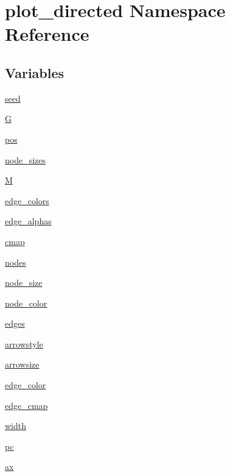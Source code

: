 \hypertarget{namespaceplot__directed}{}\section{plot\+\_\+directed Namespace Reference}
\label{namespaceplot__directed}
\subsection*{Variables}
\begin{DoxyCompactItemize}
\item 
\hyperlink{namespaceplot__directed_a766e952c8362606304e4f31c082e4c9c}{seed}
\item 
\hyperlink{namespaceplot__directed_a092250c49ed5b4f2f22ad54a9c0139f0}{G}
\item 
\hyperlink{namespaceplot__directed_a78aea26e34763b0cafe73f527626f445}{pos}
\item 
\hyperlink{namespaceplot__directed_a47903c90ca8f43b582e606c0285d077d}{node\+\_\+sizes}
\item 
\hyperlink{namespaceplot__directed_aa204b2c8be5f31ce327fce0a9d383f90}{M}
\item 
\hyperlink{namespaceplot__directed_abebe72b5e8b2f29983c27d28032e5eb9}{edge\+\_\+colors}
\item 
\hyperlink{namespaceplot__directed_acc8d18d9115291caf2aed17ba19e6c27}{edge\+\_\+alphas}
\item 
\hyperlink{namespaceplot__directed_a33d775365f05135e5d50ed14c1beae3c}{cmap}
\item 
\hyperlink{namespaceplot__directed_ae251c329afcef36227e099b623236d2d}{nodes}
\item 
\hyperlink{namespaceplot__directed_a95f9e05638ba5cce11e80456602dd2b6}{node\+\_\+size}
\item 
\hyperlink{namespaceplot__directed_a0965eae89f8a7ca5f7a270f2a6bd4f15}{node\+\_\+color}
\item 
\hyperlink{namespaceplot__directed_a3720d80ef4047a9b43b8157ee4400bd8}{edges}
\item 
\hyperlink{namespaceplot__directed_ad9cae60cbc7723168863c1030f3884ef}{arrowstyle}
\item 
\hyperlink{namespaceplot__directed_a3bbb0e67cdb48ec2f6d57c0fb749eac2}{arrowsize}
\item 
\hyperlink{namespaceplot__directed_ac77776be5de83ad870f5b1aa83cc068c}{edge\+\_\+color}
\item 
\hyperlink{namespaceplot__directed_ab0bb7b4005d2d8e12016230a6f124e47}{edge\+\_\+cmap}
\item 
\hyperlink{namespaceplot__directed_acdf88d2a6eacd702e35df45418ef0a48}{width}
\item 
\hyperlink{namespaceplot__directed_ae526f969120566eaf18a5c57909e8362}{pc}
\item 
\hyperlink{namespaceplot__directed_a602991187a35820a4270b5f81d3b22ae}{ax}
\end{DoxyCompactItemize}


